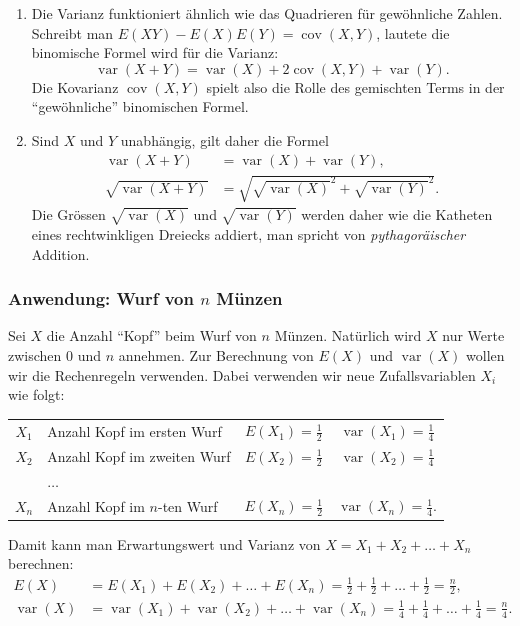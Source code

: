 \begin{enumerate}
\item
Die Varianz funktioniert ähnlich wie das Quadrieren für gewöhnliche Zahlen.
Schreibt man $E(XY)-E(X)E(Y)=\operatorname{cov}(X,Y)$, lautete die
binomische Formel wird für die Varianz:
\begin{equation}
\operatorname{var}(X+Y)=\operatorname{var}(X)
+2\operatorname{cov}(X,Y)
+\operatorname{var}(Y).
\label{var-summe-abhaengig}
\end{equation}
Die Kovarianz $\operatorname{cov}(X,Y)$ spielt also die Rolle des gemischten
Terms in der ``gewöhnliche'' binomischen Formel.
\item
Sind $X$ und $Y$ unabhängig, gilt daher die Formel
\begin{align*}
\operatorname{var}(X+Y)
&=
\operatorname{var}(X)
+
\operatorname{var}(Y),
\\
\sqrt{\operatorname{var}(X+Y)}
&=
\sqrt{
\sqrt{\operatorname{var}(X)}^2
+
\sqrt{\operatorname{var}(Y)}^2
}.
\end{align*}
Die Grössen $\sqrt{\operatorname{var}(X)}$ und $\sqrt{\operatorname{var}(Y)}$
werden daher wie die Katheten eines rechtwinkligen Dreiecks addiert,
man spricht von {\it pythagoräischer} Addition.
\end{enumerate}

\subsubsection{Anwendung: Wurf von \texorpdfstring{$n$}{n} Münzen}
Sei $X$ die Anzahl ``Kopf'' beim Wurf von $n$ Münzen.
Natürlich wird
$X$ nur Werte zwischen $0$ und $n$ annehmen.
Zur Berechnung von $E(X)$ und $\operatorname{var}(X)$ wollen wir
die Rechenregeln verwenden.
Dabei verwenden wir neue Zufallsvariablen
$X_i$ wie folgt:
\begin{center}
\begin{tabular}{clcc}
$X_1$&Anzahl Kopf im ersten Wurf&$E(X_1)=\frac12$&$\operatorname{var}(X_1)=\frac14$\\
$X_2$&Anzahl Kopf im zweiten Wurf&$E(X_2)=\frac12$&$\operatorname{var}(X_2)=\frac14$\\
&$\dots$&&\\
$X_n$&Anzahl Kopf im $n$-ten Wurf&$E(X_n)=\frac12$&$\operatorname{var}(X_n)=\frac14$.
\end{tabular}
\end{center}
Damit kann man Erwartungswert und Varianz von $X=X_1+X_2+\dots+X_n$ berechnen:
\begin{align*}
E(X)&=
E(X_1)+
E(X_2)+\dots+
E(X_n)
=
\frac{1}2+
\frac{1}2+\dots+
\frac{1}2=\frac{n}2,
\\
\operatorname{var}(X)
&=
\operatorname{var}(X_1)
+
\operatorname{var}(X_2)
+\dots+
\operatorname{var}(X_n)
=\frac14+\frac14+\dots+\frac14=\frac{n}4.
\end{align*}

